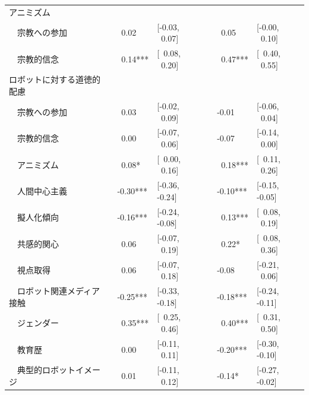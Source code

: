 \documentclass[a4j,12pt]{jreport}
\begin{document}
\begin{table}[H]
{\begin{threeparttable}
\begin{tabular}{@{}lllllll@{}}
アニミズム                             &  &                               &                      &  &                               &                      \\
~~宗教への参加            &  & ~0.02                        & {[}-0.03, ~0.07{]}  &  & ~0.05                        & {[}-0.00, ~0.10{]}  \\
~~宗教的信念            &  & ~0.14***                     & {[}~0.08, ~0.20{]} &  & ~0.47***                     & {[}~0.40, ~0.55{]} \\
ロボットに対する道徳的配慮               &  &                               &                      &  &                               &                      \\
~~宗教への参加            &  & ~0.03                        & {[}-0.02, ~0.09{]}  &  & -0.01                         & {[}-0.06, ~0.04{]}  \\
~~宗教的信念            &  & ~0.00                             & {[}-0.07, ~0.06{]}  &  & -0.07                         & {[}-0.14, ~0.00{]}  \\
~~アニミズム                         &  & ~0.08* & {[}~0.00, ~0.16{]} &  & ~0.18***                     & {[}~0.11, ~0.26{]} \\
~~人間中心主義           &  & -0.30***                      & {[}-0.36, -0.24{]}   &  & -0.10***                      & {[}-0.15, -0.05{]}   \\
~~擬人化傾向              &  & -0.16***                      & {[}-0.24, -0.08{]}   &  & ~0.13***                     & {[}~0.08, ~0.19{]} \\
~~共感的関心                &  & ~0.06                        & {[}-0.07, ~0.19{]}  &  & ~0.22* & {[}~0.08, ~0.36{]} \\
~~視点取得              &  & ~0.06                        & {[}-0.07, ~0.18{]}  &  & -0.08                         & {[}-0.21, ~0.06{]}  \\
~~ロボット関連メディア接触 &  & -0.25***                      & {[}-0.33, -0.18{]}   &  & -0.18***                      & {[}-0.24, -0.11{]}   \\
~~ジェンダー                          &  & ~0.35***                     & {[}~0.25, ~0.46{]} &  & ~0.40***                     & {[}~0.31, ~0.50{]} \\
~~教育歴                       &  & ~0.00                            & {[}-0.11, ~0.11{]}  &  & -0.20***                      & {[}-0.30, -0.10{]}   \\
~~典型的ロボットイメージ                       &  & ~0.01                            & {[}-0.11, ~0.12{]}  &  & -0.14*                      & {[}-0.27, -0.02{]}   \\

\end{tabular}
\end{threeparttable}}
\end{table}
\end{document}
